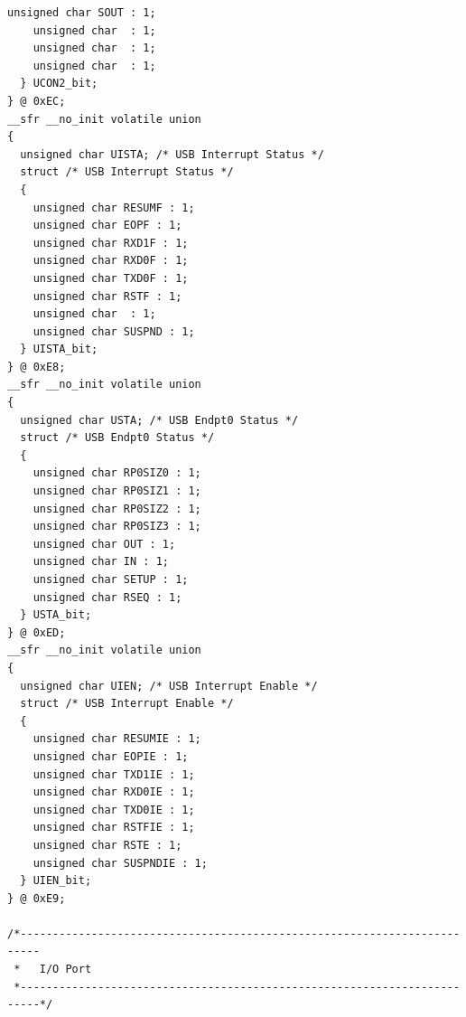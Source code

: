 \documentclass[10pt,a4paper,final]{article}
\begin{document}
\begin{lstlisting}[label={list:first},caption=Code source]
    unsigned char SOUT : 1;
    unsigned char  : 1;
    unsigned char  : 1;
    unsigned char  : 1;
  } UCON2_bit;
} @ 0xEC;
__sfr __no_init volatile union
{
  unsigned char UISTA; /* USB Interrupt Status */
  struct /* USB Interrupt Status */
  {
    unsigned char RESUMF : 1;
    unsigned char EOPF : 1;
    unsigned char RXD1F : 1;
    unsigned char RXD0F : 1;
    unsigned char TXD0F : 1;
    unsigned char RSTF : 1;
    unsigned char  : 1;
    unsigned char SUSPND : 1;
  } UISTA_bit;
} @ 0xE8;
__sfr __no_init volatile union
{
  unsigned char USTA; /* USB Endpt0 Status */
  struct /* USB Endpt0 Status */
  {
    unsigned char RP0SIZ0 : 1;
    unsigned char RP0SIZ1 : 1;
    unsigned char RP0SIZ2 : 1;
    unsigned char RP0SIZ3 : 1;
    unsigned char OUT : 1;
    unsigned char IN : 1;
    unsigned char SETUP : 1;
    unsigned char RSEQ : 1;
  } USTA_bit;
} @ 0xED;
__sfr __no_init volatile union
{
  unsigned char UIEN; /* USB Interrupt Enable */
  struct /* USB Interrupt Enable */
  {
    unsigned char RESUMIE : 1;
    unsigned char EOPIE : 1;
    unsigned char TXD1IE : 1;
    unsigned char RXD0IE : 1;
    unsigned char TXD0IE : 1;
    unsigned char RSTFIE : 1;
    unsigned char RSTE : 1;
    unsigned char SUSPNDIE : 1;
  } UIEN_bit;
} @ 0xE9;

/*-------------------------------------------------------------------------
 *   I/O Port
 *-------------------------------------------------------------------------*/


\end{lstlisting}
\end{document}
